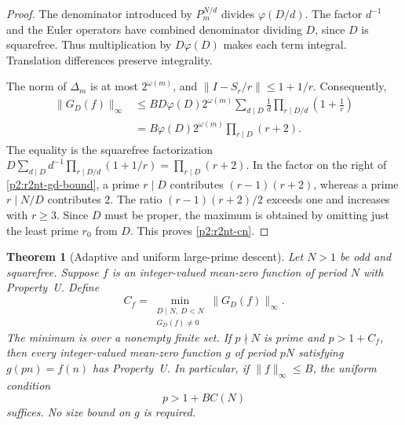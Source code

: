 \documentclass[11pt,a4paper]{article}
\newtheorem{theorem}{Theorem}[section]
\theoremstyle{definition}
\theoremstyle{remark}
\numberwithin{equation}{section}
\begin{document}
\begin{proof}
The denominator introduced by $P_m^{N/d}$ divides
$\varphi(D/d)$.  The factor $d^{-1}$ and the Euler operators have
combined denominator dividing $D$, since $D$ is squarefree.
Thus multiplication by $D\varphi(D)$ makes each term integral.
Translation differences preserve integrality.

The norm of $\Delta_m$ is at most $2^{\omega(m)}$, and
$\|I-S_r/r\|\le1+1/r$.  Consequently,
\begin{align*}
 \|G_D(f)\|_\infty
 &\le B D\varphi(D)2^{\omega(m)}
   \sum_{d\mid D}\frac1d\prod_{r\mid D/d}\left(1+\frac1r\right)\\
 &= B\varphi(D)2^{\omega(m)}\prod_{r\mid D}(r+2).
\end{align*}
The equality is the squarefree factorization
$D\sum_{d\mid D}d^{-1}\prod_{r\mid D/d}(1+1/r)=\prod_{r\mid D}(r+2)$.
In the factor on the right of \eqref{p2:r2nt-gd-bound}, a prime
$r\mid D$ contributes $(r-1)(r+2)$, whereas a prime
$r\mid N/D$ contributes $2$.  The ratio
$(r-1)(r+2)/2$ exceeds one and increases with $r\ge3$.
Since $D$ must be proper, the maximum is obtained by omitting just
the least prime $r_0$ from $D$.  This proves \eqref{p2:r2nt-cn}.
\end{proof}

\begin{theorem}[Adaptive and uniform large-prime descent]
\label{p2:r2nt-descent}
Let $N>1$ be odd and squarefree.  Suppose $f$ is an integer-valued
mean-zero function of period $N$ with Property~U.  Define
\[
 C_f=\min_{\substack{D\mid N,\ D<N\\G_D(f)\ne0}}
                  \|G_D(f)\|_\infty.
\]
The minimum is over a nonempty finite set.  If $p\nmid N$ is prime
and $p>1+C_f$, then every integer-valued mean-zero function $g$ of
period $pN$ satisfying $g(pn)=f(n)$ has Property~U.
In particular, if $\|f\|_\infty\le B$, the uniform condition
\begin{equation}
\label{p2:r2nt-uniform-prime-bound}
 p>1+B C(N)
\end{equation}
suffices.  No size bound on $g$ is required.
\end{theorem}
\end{document}

